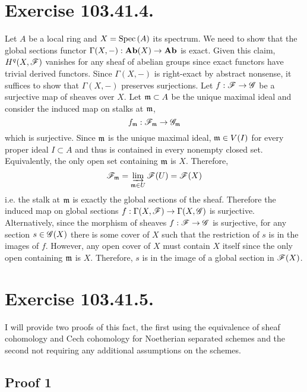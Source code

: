 \documentclass[12pt]{article}
\begin{document}
\section{Exercise 103.41.4.}

Let $A$ be a local ring and $X = \mathrm{Spec}\left( A \right)$ its spectrum. We need to show that the global sections functor $\Gamma(X, -) : \mathbf{Ab}(X) \to \mathbf{Ab}$ is exact. Given this claim, $H^q(X, \mathscr{F})$ vanishes for any sheaf of abelian groups since exact functors have trivial derived functors. Since $\Gamma(X, -)$ is right-exact by abstract nonsense, it suffices to show that $\Gamma(X, -)$ preserves surjections. Let $f : \mathscr{F} \to \mathscr{G}$ be a surjective map of sheaves over $X$. Let $\mathfrak{m} \subset A$ be the unique maximal ideal and consider the induced map on stalks at $\mathfrak{m}$,
\[ f_{\mathfrak{m}} : \mathscr{F}_{\mathfrak{m}} \to \mathscr{G}_{\mathfrak{m}} \]
which is surjective. 
Since $\mathfrak{m}$ is the unique maximal ideal, $\mathfrak{m} \in V(I)$ for every proper ideal $I \subset A$ and thus is contained in every nonempty closed set. Equivalently, the only open set containing $\mathfrak{m}$ is $X$. Therefore,
\[ \mathscr{F}_{\mathfrak{m}} = \varinjlim_{\mathfrak{m} \in U} \mathscr{F}(U) = \mathscr{F}(X) \]
i.e. the stalk at $\mathfrak{m}$ is exactly the global sections of the sheaf. Therefore the induced map on global sections $f : \Gamma(X, \mathscr{F}) \to \Gamma(X, \mathscr{G})$ is surjective. Alternatively, since the morphism of sheaves $f : \mathscr{F} \to \mathscr{G}$ is surjective, for any section $s \in \mathscr{G}(X)$ there is some cover of $X$ such that the restriction of $s$ is in the images of $f$. However, any open cover of $X$ must contain $X$ itself since the only open containing $\mathfrak{m}$ is $X$. Therefore, $s$ is in the image of a global section in $\mathscr{F}(X)$.

\section{Exercise 103.41.5.}

I will provide two proofs of this fact, the first using the equivalence of sheaf cohomology and Cech cohomology for Noetherian separated schemes and the second not requiring any additional assumptions on the schemes.

\subsection{Proof 1} 
\end{document}
